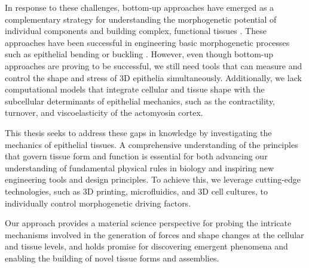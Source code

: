 In response to these challenges, bottom-up approaches have emerged as a complementary strategy for understanding the morphogenetic potential of individual components and building complex, functional tissues \cite{trentesaux2023, ingber2018}. These approaches have been successful in engineering basic morphogenetic processes such as epithelial bending or buckling \cite{matejcic2022}. However, even though bottom-up approaches are proving to be successful, we still need tools that can measure and control the shape and stress of 3D epithelia simultaneously. Additionally, we lack computational models that integrate cellular and tissue shape with the subcellular determinants of epithelial mechanics, such as the contractility, turnover, and viscoelasticity of the actomyosin cortex.

This thesis seeks to address these gaps in knowledge by investigating the mechanics of epithelial tissues. A comprehensive understanding of the principles that govern tissue form and function is essential for both advancing our understanding of fundamental physical rules in biology and inspiring new engineering tools and design principles. To achieve this, we leverage cutting-edge technologies, such as 3D printing, microfluidics, and 3D cell cultures, to individually control morphogenetic driving factors. 

Our approach provides a material science perspective for probing the intricate mechanisms involved in the generation of forces and shape changes at the cellular and tissue levels, and holds promise for discovering emergent phenomena and enabling the building of novel tissue forms and assemblies.  
